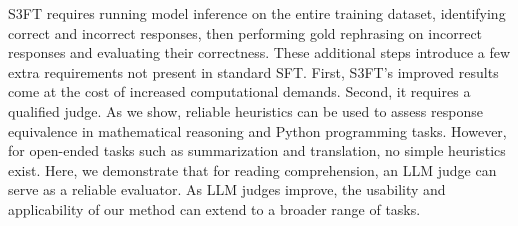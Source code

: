 
S3FT requires running model inference on the entire training dataset, identifying correct and incorrect responses, then performing gold rephrasing on incorrect responses and evaluating their correctness. These additional steps introduce a few extra requirements not present in standard SFT.
First, S3FT's improved results come at the cost of increased computational demands. Second, it requires a qualified judge. As we show, reliable heuristics can be used to assess response equivalence in mathematical reasoning and Python programming tasks. However, for open-ended tasks such as summarization and translation, no simple heuristics exist.
Here, we demonstrate that for reading comprehension, an LLM judge can serve as a reliable evaluator. As LLM judges improve, the usability and applicability of our method can extend to a broader range of tasks.


